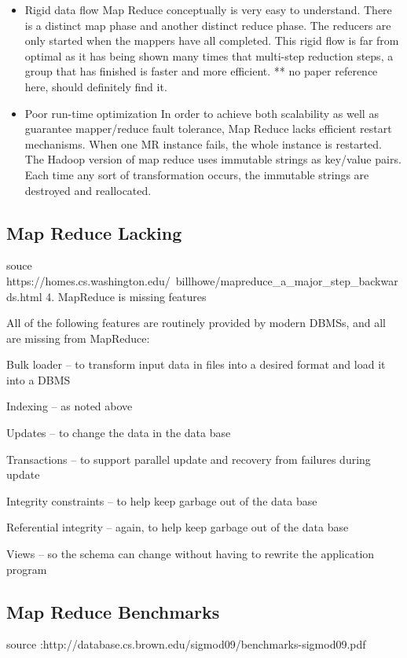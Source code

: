 \documentclass[10pt,twocolumn]{IEEEtran11}
\begin{document}
\begin{itemize}
    \item Rigid data flow
        Map Reduce conceptually is very easy to understand.  There is a distinct map phase and another distinct reduce phase.  The reducers are only started when the mappers have all completed.  This rigid flow is far from optimal as it has being shown many times that multi-step reduction steps, a group that has finished is faster and more efficient. ** no paper reference here, should definitely find it.
    
    \item Poor run-time optimization
        In order to achieve both scalability as well as guarantee mapper/reduce fault tolerance, Map Reduce lacks efficient restart mechanisms.  When one MR instance fails, the whole instance is restarted.
        The Hadoop version of map reduce uses immutable strings as key/value pairs.  Each time any sort of transformation occurs, the immutable strings are destroyed and reallocated.
    
\end{itemize}

\subsection{Map Reduce Lacking}

souce https://homes.cs.washington.edu/~billhowe/mapreduce_a_major_step_backwards.html
4.  MapReduce is missing features

All of the following features are routinely provided by modern DBMSs, and all are missing from MapReduce:

Bulk loader -- to transform input data in files into a desired format and load it into a DBMS

Indexing -- as noted above

Updates -- to change the data in the data base

Transactions -- to support parallel update and recovery from failures during update

Integrity constraints -- to help keep garbage out of the data base

Referential integrity -- again, to help keep garbage out of the data base

Views -- so the schema can change without having to rewrite the application program


\subsection{Map Reduce Benchmarks}
source :http://database.cs.brown.edu/sigmod09/benchmarks-sigmod09.pdf
\end{document}
